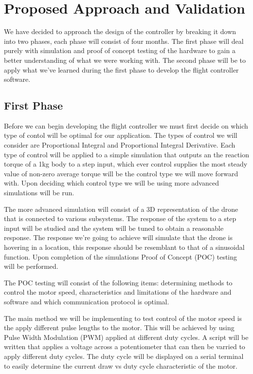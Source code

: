 \section{Proposed Approach and Validation}
We have decided to approach the design of the controller by breaking it down into two phases, each phase will consist of four months. The first phase will deal purely with simulation and proof of concept testing of the hardware to gain a better understanding of what we were working with. The second phase will be to apply what we've learned during the first phase to develop the flight controller software.

\subsection{First Phase}
Before we can begin developing the flight controller we must first decide on which type of contol will be optimal for our application. The types of control we will consider are Proportional Integral and Proportional Integral Derivative. Each type of control will be applied to a simple simulation that outputs an the reaction torque of a 1kg body to a step input, which ever control supplies the most steady value of non-zero average torque will be the control type we will move forward with. Upon deciding which control type we will be using more advanced simulations will be run.

The more advanced simulation will consist of a 3D representation of the drone that is connected to various subsystems. The response of the system to a step input will be studied and the system will be tuned to obtain a reasonable response. The response we're going to achieve will simulate that the drone is hovering in a location, this response should be resemblant to that of a sinusoidal function. Upon completion of the simulations Proof of Concept (POC) testing will be performed. 

The POC testing will consist of the following items: determining methods to control the motor speed, characteristics and limitations of the hardware and software and which communication protocol is optimal. 

The main method we will be implementing to test control of the motor speed is the apply different pulse lengths to the motor. This will be achieved by using Pulse Width Modulation (PWM) applied at different duty cycles. A script will be written that applies a voltage across a potentiometer that can then be varried to apply different duty cycles. The duty cycle will be displayed on a serial terminal to easily determine the current draw vs duty cycle characteristic of the motor. 

